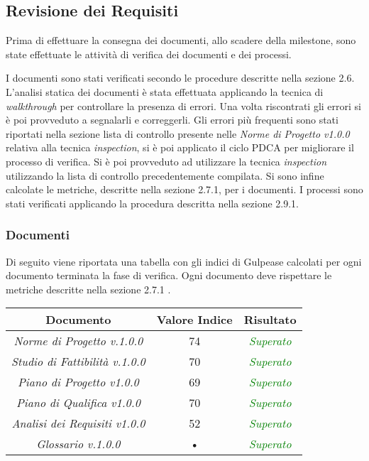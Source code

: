 \subsection{Revisione dei Requisiti}

Prima di effettuare la consegna dei documenti, allo scadere della milestone, sono state effettuate le attività di verifica dei documenti e dei processi.

\noindent I documenti sono stati verificati secondo le procedure descritte nella sezione 2.6.
L'analisi statica dei documenti è stata effettuata applicando la tecnica di \textit{walkthrough} per controllare la presenza di errori. Una volta riscontrati gli errori si è poi provveduto a segnalarli e correggerli. Gli errori più frequenti sono stati riportati nella sezione lista di controllo presente nelle \textit{Norme di Progetto v1.0.0} relativa alla tecnica \textit{inspection}, si è poi applicato il ciclo PDCA per migliorare il processo di verifica. Si è poi provveduto ad utilizzare la tecnica \textit{inspection} utilizzando la lista di controllo precedentemente compilata. Si sono infine calcolate le metriche, descritte nella sezione 2.7.1, per i documenti. I processi sono stati verificati applicando la procedura descritta nella sezione 2.9.1.

\subsubsection{Documenti}

Di seguito viene riportata una tabella con gli indici di Gulpease calcolati per ogni documento terminata la fase di verifica. Ogni documento deve rispettare le metriche descritte nella sezione 2.7.1 .\\

\hspace{1cm}

\begin{center}
\begin{tabular}{|c|c|c|}
\hline 
\textbf{Documento} & \textbf{Valore Indice} & \textbf{Risultato} \\ 
\hline
\textit{Norme di Progetto v.1.0.0} & 74 & \textcolor{green}{\textit{Superato}} \\ 
\textit{Studio di Fattibilità v.1.0.0} & 70 & \textcolor{green}{\textit{Superato}} \\ 
\textit{Piano di Progetto v1.0.0} & 69 & \textcolor{green}{\textit{Superato}} \\ 
\textit{Piano di Qualifica v1.0.0} & 70 & \textcolor{green}{\textit{Superato}} \\ 
\textit{Analisi dei Requisiti v1.0.0} & 52 & \textcolor{green}{\textit{Superato}} \\ 
\textit{Glossario v.1.0.0} & • & \textcolor{green}{\textit{Superato}} \\ 
\hline 
\end{tabular}

\end{center}